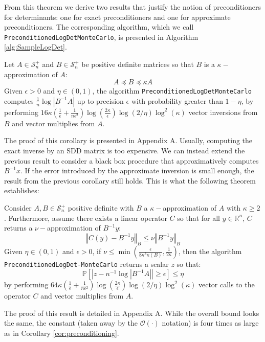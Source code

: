 From this theorem we derive two results that justify the notion of
preconditioners for determinants: one for exact preconditioners and
one for approximate preconditioners. The corresponding algorithm,
which we call \texttt{PreconditionedLogDetMonteCarlo}, is presented
in Algorithm \ref{alg:SampleLogDet}.
\begin{corollary}
\label{cor:preconditioning}Let $A\in\mathcal{S}_{n}^{+}$ and $B\in\mathcal{S}_{n}^{+}$
be positive definite matrices so that $B$ is a $\kappa-$approximation
of $A$: 
\begin{equation}
A\preceq B\preceq\kappa A\label{eq:A-B-bounds}
\end{equation}
Given $\epsilon>0$ and $\eta\in\left(0,1\right)$, the algorithm
\texttt{PreconditionedLogDetMonteCarlo} computes $\frac{1}{n}\log\left|B^{-1}A\right|$
up to precision $\epsilon$ with probability greater than $1-\eta$,
by performing $16\kappa\left(\frac{1}{\epsilon}+\frac{1}{n\epsilon^{2}}\right)\log\left(\frac{2\kappa}{\epsilon}\right)\log\left(2/\eta\right)\log^{2}\left(\kappa\right)$
vector inversions from $B$ and vector multiplies from $A$.
\end{corollary}
The proof of this corollary is presented in Appendix A. Usually, computing
the exact inverse by an SDD matrix is too expensive. We can instead
extend the previous result to consider a black box procedure that
approximatively computes $B^{-1}x$. If the error introduced by the
approximate inversion is small enough, the result from the previous
corollary still holds. This is what the following theorem establishes:
\begin{theorem}
\label{thm:preconditioning-approx}Consider $A,B\in\mathcal{S}_{n}^{+}$
positive definite with $B$ a $\kappa-$approximation of $A$ with
$\kappa\geq2$. Furthermore, assume there exists a linear operator
$C$ so that for all $y\in\mathbb{R}^{n}$, $C$ returns a $\nu-$approximation
of $B^{-1}y$: 
\[
\left\Vert C\left(y\right)-B^{-1}y\right\Vert _{B}\leq\nu\left\Vert B^{-1}y\right\Vert _{B}
\]
Given $\eta\in\left(0,1\right)$ and $\epsilon>0$, if $\nu\leq\min\left(\frac{\epsilon}{8\kappa^{3}\kappa\left(B\right)},\frac{1}{2\kappa}\right)$,
then the algorithm \\
 \texttt{PreconditionedLogDet-MonteCarlo} returns a scalar $z$ so
that: 
\[
\mathbb{P}\left[\left|z-n^{-1}\log\left|B^{-1}A\right|\right|\geq\epsilon\right]\leq\eta
\]
by performing $64\kappa\left(\frac{1}{\epsilon}+\frac{1}{n\epsilon^{2}}\right)\log\left(\frac{2\kappa}{\epsilon}\right)\log\left(2/\eta\right)\log^{2}\left(\kappa\right)$
vector calls to the operator $C$ and vector multiplies from $A$.
\end{theorem}
The proof of this result is detailed in Appendix A. While the overall
bound looks the same, the constant (taken away by the $\mathcal{O}\left(\cdot\right)$
notation) is four times as large as in Corollary \ref{cor:preconditioning}.

